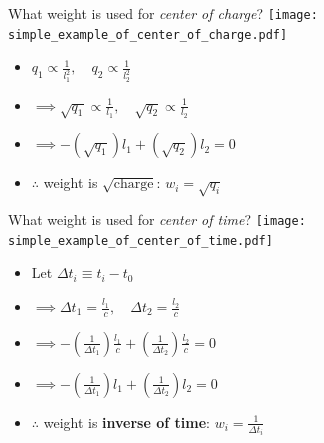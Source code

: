 \documentclass[14pt]{beamer}
\begin{document}
\begin{frame}{What weight is used for \emph{\color{magenta}center of charge}?}
	\texttt{[image: simple\_example\_of\_center\_of\_charge.pdf]}
	\begin{itemize}
		\item[] $q_1 \propto \frac{1}{l_1^2}, \quad q_2 \propto
			\frac{1}{l_2^2}$
		\item[] $\implies \sqrt{q_1} \propto \frac{1}{l_1}, \quad \sqrt{q_2}
			\propto \frac{1}{l_2}$
		\item[] $\implies -(\sqrt{q_1}){l_1} + (\sqrt{q_2}){l_2} = 0$
		\item[] $\therefore$ weight is \textbf{$\sqrt{\text{charge}}$}:
			$w_{i} = \sqrt{q_{i}}$
	\end{itemize}
\end{frame}

\begin{frame}{What weight is used for \emph{\color{blue}center of time}?}
	\texttt{[image: simple\_example\_of\_center\_of\_time.pdf]}
	\begin{itemize}
		\item[] Let $\Delta t_i \equiv t_i - t_0$
		\item[] $\implies \Delta t_1 = \frac{l_1}{c},\quad\Delta t_2 =
			\frac{l_2}{c}$
		\item[] $\implies -(\frac{1}{\Delta t_1})\frac{l_1}{c} +
			(\frac{1}{\Delta t_2})\frac{l_2}{c} = 0$
		\item[] $\implies -(\frac{1}{\Delta t_1})l_1 +
			(\frac{1}{\Delta t_2})l_2 = 0$
		\item[] $\therefore$ weight is \textbf{inverse of time}: $w_{i} =
			\frac{1}{\Delta t_{i}}$
	\end{itemize}
\end{frame}

\end{document}
